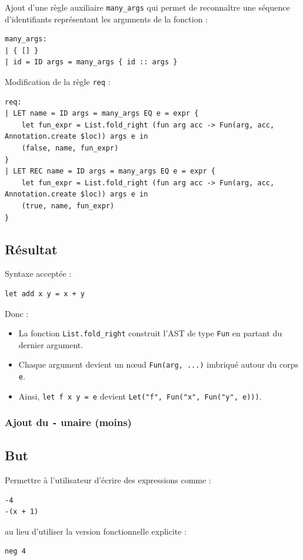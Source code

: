 Ajout d'une règle auxiliaire \texttt{many\_args} qui permet de reconnaître une séquence d'identifiants représentant les arguments de la fonction :

\begin{lstlisting}
many_args:
| { [] }
| id = ID args = many_args { id :: args }
\end{lstlisting}

Modification de la règle \texttt{req} :

\begin{lstlisting}
req:
| LET name = ID args = many_args EQ e = expr {
    let fun_expr = List.fold_right (fun arg acc -> Fun(arg, acc, Annotation.create $loc)) args e in
    (false, name, fun_expr)
}
| LET REC name = ID args = many_args EQ e = expr {
    let fun_expr = List.fold_right (fun arg acc -> Fun(arg, acc, Annotation.create $loc)) args e in
    (true, name, fun_expr)
}
\end{lstlisting}

\subsection*{Résultat}
Syntaxe acceptée :
\begin{lstlisting}
let add x y = x + y
\end{lstlisting}

Donc :
\begin{itemize}
    \item La fonction \texttt{List.fold\_right} construit l'AST de type \texttt{Fun} en partant du dernier argument.
    \item Chaque argument devient un nœud \texttt{Fun(arg, ...)} imbriqué autour du corps \texttt{e}.
    \item Ainsi, \texttt{let f x y = e} devient \texttt{Let("f", Fun("x", Fun("y", e)))}.
\end{itemize}

\subsubsection{Ajout du \texttt{-} unaire (moins)}

\subsection*{But}
Permettre à l'utilisateur d'écrire des expressions comme :
\begin{lstlisting}
-4
-(x + 1)
\end{lstlisting}
au lieu d’utiliser la version fonctionnelle explicite :
\begin{lstlisting}
neg 4
\end{lstlisting}
